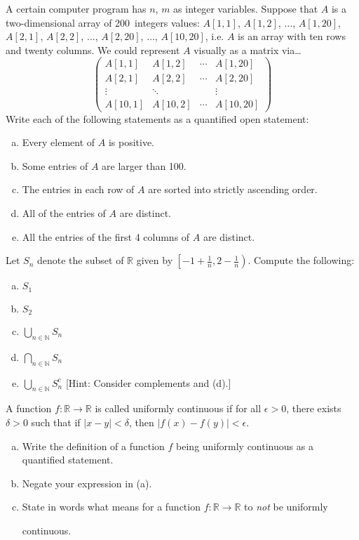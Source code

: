 \documentclass[12pt,letterpaper]{exam}
\begin{document}
\begin{questions}
\newpage
\question[10] A certain computer program has $n$, $m$ as integer variables. Suppose that $A$ is a two-dimensional array of 200~integers values: $A[1, 1]$, $A[1, 2]$, $\ldots$, $A[1, 20]$, $A[2, 1]$, $A[2, 2]$, $\ldots$, $A[2, 20]$, $\ldots$, $A[10, 20]$, i.e. $A$ is an array with ten rows and twenty columns. We could represent $A$ visually as a matrix via\ldots
	\[
	\begin{pmatrix}
	A[1,1] & A[1,2] & \cdots & A[1,20] \\
	A[2,1] & A[2,2] & \cdots & A[2,20] \\
	\vdots & \ddots & & \vdots \\
	A[10,1] & A[10,2] & \cdots & A[10,20]
	\end{pmatrix}
	\]
Write each of the following statements as a quantified open statement:
	\begin{enumerate}[(a)]
	\item Every element of $A$ is positive. 
	\item Some entries of $A$ are larger than 100.
	\item The entries in each row of $A$ are sorted into strictly ascending order.
	\item All of the entries of $A$ are distinct. 
	\item All the entries of the first 4 columns of $A$ are distinct. 
	\end{enumerate}



\newpage
\question[10] Let $S_n$ denote the subset of $\mathbb{R}$ given by $\left[-1 + \frac{1}{n}, 2 - \frac{1}{n} \right)$. Compute the following:
	\begin{enumerate}[(a)]
	\item $S_1$
	\item $S_2$
	\item $\displaystyle \bigcup_{n \in \mathbb{N}} S_n$
	\item $\displaystyle \bigcap_{n \in \mathbb{N}} S_n$
	\item $\displaystyle \bigcup_{n \in \mathbb{N}} S_n^c$ [Hint: Consider complements and (d).]
	\end{enumerate}



\newpage
\question[10] A function $f: \mathbb{R} \to \mathbb{R}$ is called uniformly continuous if for all $\epsilon > 0$, there exists $\delta > 0$ such that if $|x - y| < \delta$, then $|f(x) - f(y)| < \epsilon$. 
	\begin{enumerate}[(a)]
	\item Write the definition of a function $f$ being uniformly continuous as a quantified statement.
	\item Negate your expression in (a).
	\item State in words what means for a function $f: \mathbb{R} \to \mathbb{R}$ to \textit{not} be uniformly \par continuous. 
	\end{enumerate}




\end{questions}
\end{document}
